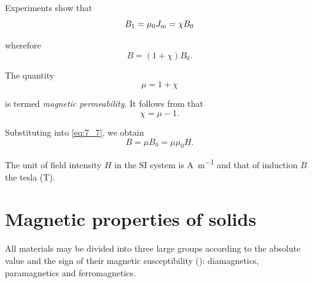 \noindent
Experiments show that
\begin{equation}\label{eq:7_6}
    B_1 = \mu_0 J_{\text{m}} = \chi B_0
\end{equation}

\noindent
wherefore
\begin{equation}\label{eq:7_7}
    B = (1 + \chi) B_0.
\end{equation}

\noindent
The quantity
\begin{equation}\label{eq:7_8}
    \mu = 1 + \chi
\end{equation}

\noindent
is termed \textit{magnetic permeability}. It follows from  that
\begin{equation}\label{eq:7_9}
    \chi = \mu - 1.
\end{equation}

\noindent
Substituting  into \eqref{eq:7_7}, we obtain
\begin{equation}\label{eq:7_10}
    B = \mu B_0 = \mu \mu_0 H.
\end{equation}

\noindent
The unit of field intensity $H$ in the SI system is \si{\ampere\per\metre} and that of induction $B$ the tesla (\si{\tesla}).

\section{Magnetic properties of solids}\label{sec:64}

All materials may be divided into three large groups according to the absolute value and the sign of their magnetic susceptibility (): diamagnetics, paramagnetics and ferromagnetics.

\begin{table}[!b]
	\renewcommand{\arraystretch}{1.2}
	\caption{}
	\vspace{-0.6cm}
	\label{table:7_1}
	\begin{center}\end{center}
\end{table}

